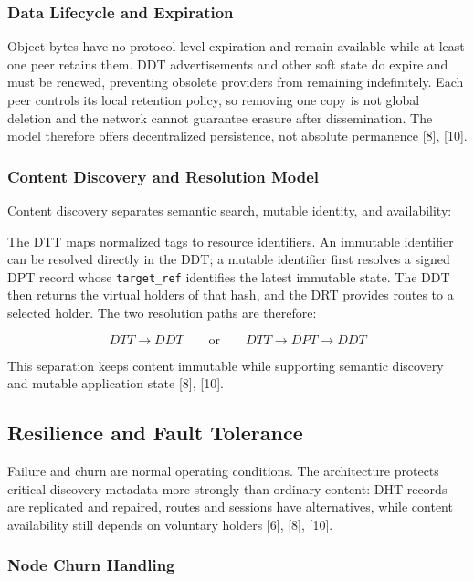 \documentclass[12pt,a4paper]{article}
\begin{document}
\subsubsection{Data Lifecycle and Expiration}

Object bytes have no protocol-level expiration and remain available while at least one
peer retains them. DDT advertisements and other soft state do expire and must be
renewed, preventing obsolete providers from remaining indefinitely. Each peer controls
its local retention policy, so removing one copy is not global deletion and the network
cannot guarantee erasure after dissemination. The model therefore offers decentralized
persistence, not absolute permanence [8], [10].

\subsubsection{Content Discovery and Resolution Model}

Content discovery separates semantic search, mutable identity, and availability:

\thesisdtttikz

The DTT maps normalized tags to resource identifiers. An immutable identifier can be
resolved directly in the DDT; a mutable identifier first resolves a signed DPT record
whose \texttt{target\_ref} identifies the latest immutable state. The DDT then returns
the virtual holders of that hash, and the DRT provides routes to a selected holder.
The two resolution paths are therefore:

\[
DTT \rightarrow DDT
\qquad\text{or}\qquad
DTT \rightarrow DPT \rightarrow DDT
\]

This separation keeps content immutable while supporting semantic discovery and
mutable application state [8], [10].



\subsection{Resilience and Fault Tolerance}

Failure and churn are normal operating conditions. The architecture protects critical
discovery metadata more strongly than ordinary content: DHT records are replicated
and repaired, routes and sessions have alternatives, while content availability still
depends on voluntary holders [6], [8], [10].

\subsubsection{Node Churn Handling}
\end{document}

